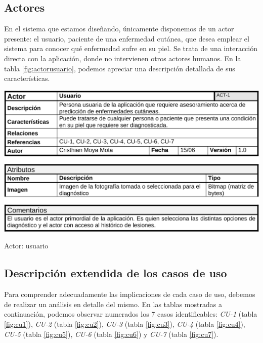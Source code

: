 \subsection{Actores}

En el sistema que estamos diseñando, únicamente disponemos de un actor presente: el usuario, paciente de una enfermedad cutánea, que desea emplear el sistema para conocer qué enfermedad sufre en su piel. Se trata de una interacción directa con la aplicación, donde no intervienen otros actores humanos. En la tabla \ref{fig:actorusuario}, podemos apreciar una descripción detallada de sus características.

  \begin{table}[H]
	\centering
	\includegraphics[scale = 0.225]{imagenes/tablausuario.png}
	\caption{Actor: usuario}
	\label{fig:actorusuario}
\end{table}

\subsection	{Descripción extendida de los casos de uso}

Para comprender adecuadamente las implicaciones de cada caso de uso, debemos de realizar un análisis en detalle del mismo. En las tablas mostradas a continuación, podemos observar numerados los 7 casos identificables: \textit{CU-1} (tabla \ref{fig:cu1}), \textit{CU-2} (tabla \ref{fig:cu2}), \textit{CU-3} (tabla \ref{fig:cu3}), \textit{CU-4} (tabla \ref{fig:cu4}), \textit{CU-5} (tabla \ref{fig:cu5}), \textit{CU-6} (tabla \ref{fig:cu6}) y \textit{CU-7} (tabla \ref{fig:cu7}).

